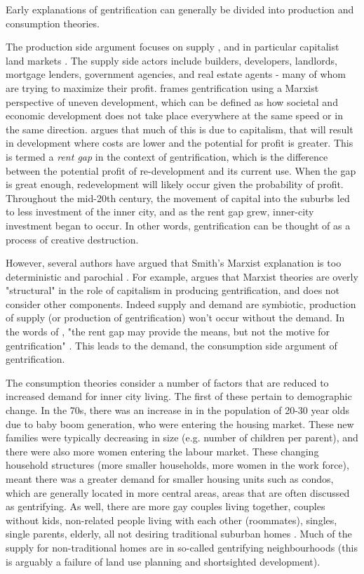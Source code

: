 Early explanations of gentrification can generally be divided into production and consumption theories.

The production side argument focuses on supply \cite{hamnett_blind_1991}, and in particular capitalist land markets \cite{smith_gentrification_1987}. The supply side actors include builders, developers, landlords, mortgage lenders, government agencies, and real estate agents - many of whom are trying to maximize their profit.
 frames gentrification using a Marxist perspective of uneven development, which can be defined as how societal and economic development does not take place everywhere at the same speed or in the same direction.  argues that much of this is due to capitalism, that will result in development where costs are lower and the potential for profit is greater. This is termed a \textit{rent gap} in the context of gentrification, which is the difference between the potential profit of re-development and its current use. When the gap is great enough, redevelopment will likely occur given the probability of profit. Throughout the mid-20th century, the movement of capital into the suburbs led to less investment of the inner city, and as the rent gap grew, inner-city investment began to occur. In other words, gentrification can be thought of as a process of creative destruction.

However, several authors have argued that Smith's Marxist explanation is too deterministic and parochial \cite{rose_rethinking_1984,ley_alternative_1986,hamnett_blind_1991}. For example,  argues that Marxist theories are overly "structural" in the role of capitalism in producing gentrification, and does not consider other components. Indeed supply and demand are symbiotic, production of supply (or production of gentrification) won't occur without the demand. In the words of , "the rent gap may provide the means, but not the motive for gentrification" \cite{hamnett_blind_1991}. This leads to the demand, the consumption side argument of gentrification.

The consumption theories consider a number of factors that are reduced to increased demand for inner city living. The first of these pertain to demographic change. In the 70s, there was an increase in in the population of 20-30 year olds due to baby boom generation, who were entering the housing market. These new families were typically decreasing in size (e.g. number of children per parent), and there were also more women entering the labour market. These changing household structures (more smaller households, more women in the work force), meant there was a greater demand for smaller housing units such as condos, which are generally located in more central areas, areas that are often discussed as gentrifying. As well, there are more gay couples living together, couples without kids, non-related people living with each other (roommates), singles, single parents, elderly, all not desiring traditional suburban homes \cite{ley_alternative_1986,bourne_changing_2001}. Much of the supply for non-traditional homes are in so-called gentrifying neighbourhoods (this is arguably a failure of land use planning and shortsighted development).

